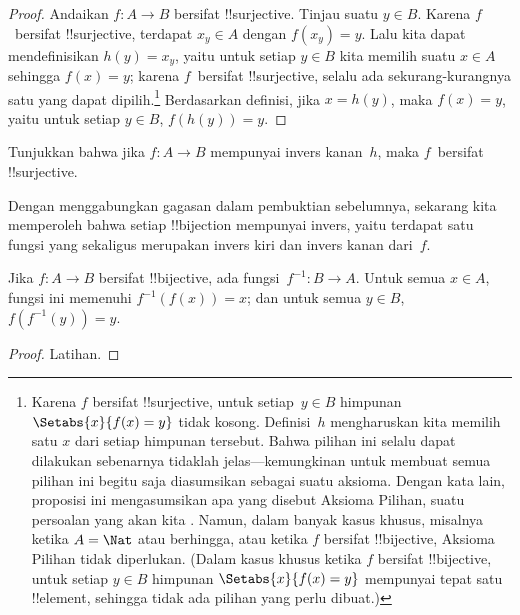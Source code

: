 \documentclass[../../../include/open-logic-section]{subfiles}
\begin{document}
\begin{proof}
Andaikan $f\colon A \to B$ bersifat !!{surjective}. Tinjau suatu $y \in B$.
Karena $f$~bersifat !!{surjective}, terdapat $x_y \in A$ dengan $f(x_y) = y$.
Lalu kita dapat mendefinisikan $h(y) = x_y$, yaitu untuk setiap $y \in B$ kita
memilih suatu $x \in A$ sehingga $f(x) = y$; karena $f$~bersifat
!!{surjective}, selalu ada sekurang-kurangnya satu yang dapat
dipilih.\footnote{Karena $f$ bersifat !!{surjective}, untuk setiap~$y \in B$
himpunan $\Setabs{x}{f(x) = y}$ tidak kosong. Definisi~$h$ mengharuskan kita
memilih satu $x$ dari setiap himpunan tersebut. Bahwa pilihan ini selalu dapat
dilakukan sebenarnya tidaklah jelas---kemungkinan untuk membuat semua pilihan
ini begitu saja diasumsikan sebagai suatu aksioma. Dengan kata lain,
proposisi ini mengasumsikan apa yang disebut Aksioma Pilihan, suatu persoalan
yang akan kita . Namun, dalam banyak kasus
khusus, misalnya ketika $A = \Nat$ atau berhingga, atau ketika $f$
bersifat !!{bijective}, Aksioma Pilihan tidak diperlukan. (Dalam kasus khusus
ketika $f$ bersifat !!{bijective}, untuk setiap $y \in B$ himpunan
$\Setabs{x}{f(x) = y}$ mempunyai tepat satu !!{element}, sehingga tidak ada
pilihan yang perlu dibuat.)}
Berdasarkan definisi, jika $x = h(y)$, maka $f(x) = y$, yaitu untuk setiap $y
\in B$, $f(h(y)) = y$.
\end{proof}

\begin{prob}
Tunjukkan bahwa jika $f\colon A \to B$ mempunyai invers kanan~$h$, maka
$f$~bersifat !!{surjective}.
\end{prob}

\begin{explain}
  Dengan menggabungkan gagasan dalam pembuktian sebelumnya, sekarang kita
  memperoleh bahwa setiap !!{bijection} mempunyai invers, yaitu terdapat satu
  fungsi yang sekaligus merupakan invers kiri dan invers kanan dari~$f$.
\end{explain}

\begin{prop}
Jika $f\colon A \to B$ bersifat !!{bijective}, ada
fungsi~$f^{-1}\colon B \to A$. Untuk semua $x \in A$, fungsi ini memenuhi
$f^{-1}(f(x)) = x$; dan untuk semua $y \in B$, $f(f^{-1}(y)) = y$.
\end{prop}

\begin{proof}
Latihan.
\end{proof}
\end{document}
